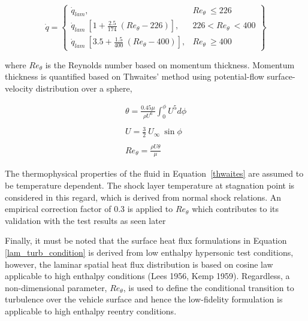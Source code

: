 \documentclass[%
 aip,
 amsmath,amssymb,
preprint,%
]{revtex4-1}
\begin{document}
\begin{equation}
\dot{q} = 
\left\{
    \begin{array}{lr}
        \dot{q}_{lam}, & Re_\theta\ \leq 226\\
        \dot{q}_{lam}~[1 + \frac{2.5}{174}~(Re_\theta - 226)], & 226 < Re_\theta\ < 400 \\
        \dot{q}_{lam}~[3.5 + \frac{1.5}{400}~(Re_\theta - 400)], & Re_\theta\ \geq 400
    \end{array}
\right\}
\label{lam_turb_condition}
\end{equation}

where $Re_\theta$ is the Reynolds number based on momentum thickness. Momentum thickness is quantified based on Thwaites' method using potential-flow surface-velocity distribution over a sphere, \cite{White_fluids} %

\begin{equation}
    \begin{array}{lr}
        \theta = \frac{0.45\mu}{\rho U^{6}}\int_{0}^{\phi} U^{5}d\phi \\
        \\
        U = \frac{3}{2}~U_\infty~ \sin\phi\\
        \\
        Re_\theta = \frac{\rho U \theta}{\mu}
    \end{array}
\label{thwaites}
\end{equation}

The thermophysical properties of the fluid in Equation~\eqref{thwaites} are assumed to be temperature dependent. The shock layer temperature at stagnation point is considered in this regard, which is derived from normal shock relations. 
An empirical correction factor of 0.3 is applied to $Re_\theta$ which contributes to its validation with the test results as seen later %

Finally, it must be noted that the surface heat flux formulations in Equation \eqref{lam_turb_condition} is derived from low enthalpy hypersonic test conditions, however, the laminar spatial heat flux distribution is based on cosine law applicable to high enthalpy conditions (Lees 1956, Kemp 1959). Regardless, a non-dimensional parameter, $Re_{\theta}$, is used to define the conditional transition to turbulence over the vehicle surface and hence the low-fidelity formulation is applicable to high enthalpy reentry conditions.
\end{document}
